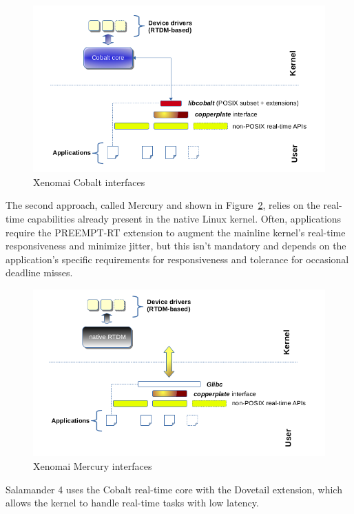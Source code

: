 \documentclass[MMR,Master,english]{twbook}
\begin{document}
\begin{figure}[H]
	\centering
	\includegraphics[width=0.8\columnwidth]{img/introduction/xenomai/x3-cobalt-interfaces.png}
	\caption[Xenomai Cobalt interfaces]{Xenomai Cobalt interfaces~\cite{XenomaiXenomai}}
	\label{fig:cobalt}
\end{figure}

\noindent  The second approach, called Mercury and shown in Figure~\ref{fig:mercury}, relies on the real-time capabilities already present in the native Linux kernel. Often, applications require the PREEMPT-RT extension to augment the mainline kernel's real-time responsiveness and minimize jitter, but this isn't mandatory and depends on the application's specific requirements for responsiveness and tolerance for occasional deadline misses.


\begin{figure}[H]
	\centering
	\includegraphics[width=0.8\columnwidth]{img/introduction/xenomai/x3-mercury-interfaces.png}
	\caption[Xenomai Mercury interfaces]{Xenomai Mercury interfaces~\cite{XenomaiXenomai}}
	\label{fig:mercury}
\end{figure}

\noindent Salamander 4 uses the Cobalt real-time core with the Dovetail extension, which allows the kernel to handle real-time tasks with low latency.
\end{document}
